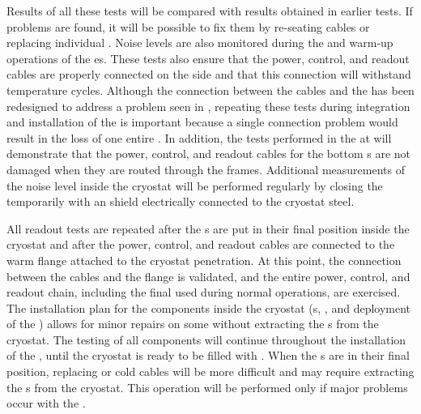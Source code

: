 Results of all these tests will be compared with results obtained 
in earlier  tests.  If problems are found, it will be possible 
to fix them by re-seating cables or replacing individual .
Noise levels are also monitored during the \cooldown and warm-up 
operations of the \coldbox{}es. These tests also ensure that the power,
control, and readout cables are properly connected
on the  side and that this connection will withstand temperature 
cycles. 
Although the connection between the cables and the 
has been redesigned to address a problem %
seen in , repeating these tests during integration
and installation of the  is important because a single connection problem would
result in the loss of one entire . In addition, the tests 
performed in the \coldbox at  will demonstrate that the power, control, and
readout cables for the bottom s are not damaged when they are routed 
through the  frames. Additional measurements of the noise
level inside the cryostat will be performed regularly by closing 
the  temporarily with an  shield electrically connected 
to the cryostat steel. 

All readout tests are repeated after the s are put
in their final position inside the cryostat and after the power, control, and
readout cables are connected to the warm flange attached to the cryostat
penetration. At this point, the connection between the cables and the flange
is validated, and the entire power, control, and readout chain, including the
final  used during normal operations, are exercised. The
installation plan for the  components inside the cryostat (s,
, and deployment of the ) allows for minor repairs on some  without extracting
the s from the cryostat. The testing of all  components
will continue throughout the installation of %
the , 
until the cryostat is ready to be filled with .  When the 
s are in their final position, replacing  
or cold cables will be more difficult and may require extracting the s 
from the cryostat. This operation will be performed only if major problems occur with the .

